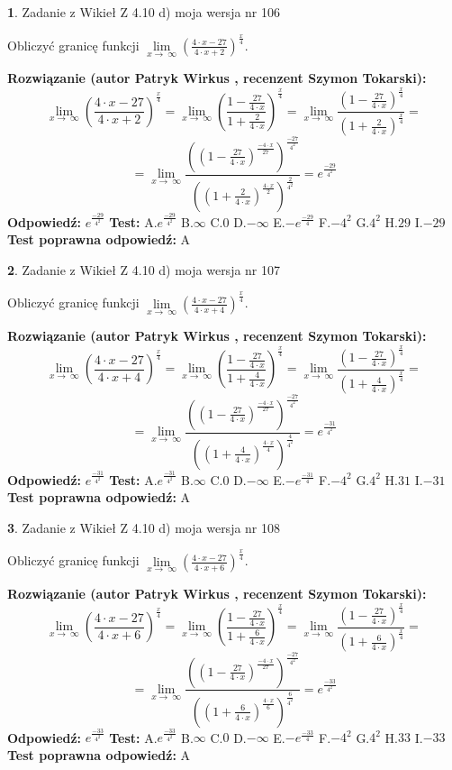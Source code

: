 \documentclass[12pt, a4paper]{article}
\theoremstyle{definition} %
\newtheorem{zad}{}
\newcommand{\zadStart}[1]{\begin{zad}#1\newline}
\newcommand{\zadStop}{\end{zad}}
\newcommand{\rozwStart}[2]{\noindent \textbf{Rozwiązanie (autor #1 , recenzent #2): }\newline}
\newcommand{\rozwStop}{\newline}
\newcommand{\odpStart}{\noindent \textbf{Odpowiedź:}\newline}
\newcommand{\odpStop}{\newline}
\newcommand{\testStart}{\noindent \textbf{Test:}\newline}
\newcommand{\testStop}{\newline}
\newcommand{\kluczStart}{\noindent \textbf{Test poprawna odpowiedź:}\newline}
\newcommand{\kluczStop}{\newline}
\begin{document}
\zadStart{Zadanie z Wikieł Z 4.10 d) moja wersja nr 106}


Obliczyć granicę funkcji  $\lim\limits_{x\to\ \infty}(\frac{4\cdot x-27}{4\cdot x+2})^{\frac{x}{4}}$.
\zadStop
\rozwStart{Patryk Wirkus}{Szymon Tokarski}
$$\lim\limits_{x\to\ \infty}(\frac{4\cdot x-27}{4\cdot x+2})^{\frac{x}{4}} = \lim\limits_{x\to\ \infty}(\frac{1-\frac{27}{4\cdot x}}{1+\frac{2}{4\cdot x}})^{\frac{x}{4}}=\lim\limits_{x\to\ \infty}\frac{(1-\frac{27}{4\cdot x})^{\frac{x}{4}}}{(1+\frac{2}{4\cdot x})^{\frac{x}{4}}}=$$
$$=\lim\limits_{x\to\ \infty}\frac{((1-\frac{27}{4\cdot x})^{\frac{-4\cdot x}{27}})^{\frac{-27}{4^{2}}}}{((1+\frac{2}{4\cdot x})^{\frac{4\cdot x}{2}})^{\frac{2}{4^{2}}}}=e^{\frac{-29}{4^{2}}}$$
\rozwStop
\odpStart
$e^{\frac{-29}{4^{2}}}$
\odpStop
\testStart
A.$e^{\frac{-29}{4^{2}}}$ B.$\infty$ C.$0$ D.$-\infty$ E.$-e^{\frac{-29}{4}}$
F.$-4^{2}$ G.$4^{2}$
H.$29$
I.$-29$
\testStop
\kluczStart
A
\kluczStop



\zadStart{Zadanie z Wikieł Z 4.10 d) moja wersja nr 107}


Obliczyć granicę funkcji  $\lim\limits_{x\to\ \infty}(\frac{4\cdot x-27}{4\cdot x+4})^{\frac{x}{4}}$.
\zadStop
\rozwStart{Patryk Wirkus}{Szymon Tokarski}
$$\lim\limits_{x\to\ \infty}(\frac{4\cdot x-27}{4\cdot x+4})^{\frac{x}{4}} = \lim\limits_{x\to\ \infty}(\frac{1-\frac{27}{4\cdot x}}{1+\frac{4}{4\cdot x}})^{\frac{x}{4}}=\lim\limits_{x\to\ \infty}\frac{(1-\frac{27}{4\cdot x})^{\frac{x}{4}}}{(1+\frac{4}{4\cdot x})^{\frac{x}{4}}}=$$
$$=\lim\limits_{x\to\ \infty}\frac{((1-\frac{27}{4\cdot x})^{\frac{-4\cdot x}{27}})^{\frac{-27}{4^{2}}}}{((1+\frac{4}{4\cdot x})^{\frac{4\cdot x}{4}})^{\frac{4}{4^{2}}}}=e^{\frac{-31}{4^{2}}}$$
\rozwStop
\odpStart
$e^{\frac{-31}{4^{2}}}$
\odpStop
\testStart
A.$e^{\frac{-31}{4^{2}}}$ B.$\infty$ C.$0$ D.$-\infty$ E.$-e^{\frac{-31}{4}}$
F.$-4^{2}$ G.$4^{2}$
H.$31$
I.$-31$
\testStop
\kluczStart
A
\kluczStop



\zadStart{Zadanie z Wikieł Z 4.10 d) moja wersja nr 108}


Obliczyć granicę funkcji  $\lim\limits_{x\to\ \infty}(\frac{4\cdot x-27}{4\cdot x+6})^{\frac{x}{4}}$.
\zadStop
\rozwStart{Patryk Wirkus}{Szymon Tokarski}
$$\lim\limits_{x\to\ \infty}(\frac{4\cdot x-27}{4\cdot x+6})^{\frac{x}{4}} = \lim\limits_{x\to\ \infty}(\frac{1-\frac{27}{4\cdot x}}{1+\frac{6}{4\cdot x}})^{\frac{x}{4}}=\lim\limits_{x\to\ \infty}\frac{(1-\frac{27}{4\cdot x})^{\frac{x}{4}}}{(1+\frac{6}{4\cdot x})^{\frac{x}{4}}}=$$
$$=\lim\limits_{x\to\ \infty}\frac{((1-\frac{27}{4\cdot x})^{\frac{-4\cdot x}{27}})^{\frac{-27}{4^{2}}}}{((1+\frac{6}{4\cdot x})^{\frac{4\cdot x}{6}})^{\frac{6}{4^{2}}}}=e^{\frac{-33}{4^{2}}}$$
\rozwStop
\odpStart
$e^{\frac{-33}{4^{2}}}$
\odpStop
\testStart
A.$e^{\frac{-33}{4^{2}}}$ B.$\infty$ C.$0$ D.$-\infty$ E.$-e^{\frac{-33}{4}}$
F.$-4^{2}$ G.$4^{2}$
H.$33$
I.$-33$
\testStop
\kluczStart
A
\kluczStop
\end{document}
